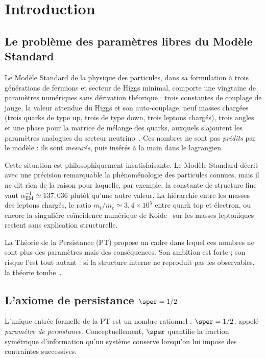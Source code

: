 \section{Introduction}
\label{sec:intro}

\subsection{Le problème des paramètres libres du Modèle Standard}
\label{sec:intro:libres}

Le Modèle Standard de la physique des particules, dans sa formulation à trois générations de fermions et secteur de Higgs minimal, comporte une vingtaine de paramètres numériques sans dérivation théorique : trois constantes de couplage de jauge, la valeur attendue du Higgs et son auto-couplage, neuf masses chargées (trois quarks de type up, trois de type down, trois leptons chargés), trois angles et une phase pour la matrice de mélange des quarks, auxquels s'ajoutent les paramètres analogues du secteur neutrino~\cite{PDG2024}. Ces nombres ne sont pas \emph{prédits} par le modèle : ils sont \emph{mesurés}, puis insérés à la main dans le lagrangien.

Cette situation est philosophiquement insatisfaisante. Le Modèle Standard décrit avec une précision remarquable la phénoménologie des particules connues, mais il ne dit rien de la raison pour laquelle, par exemple, la constante de structure fine vaut $\alpha_{\mathrm{EM}}^{-1} \simeq 137{,}036$ plutôt qu'une autre valeur. La hiérarchie entre les masses des leptons chargés, le ratio $m_t/m_e \simeq 3{,}4 \times 10^5$ entre quark top et électron, ou encore la singulière coïncidence numérique de Koide~\cite{Koide1983} sur les masses leptoniques restent sans explication structurelle.

La Théorie de la Persistance (PT) propose un cadre dans lequel ces nombres ne sont plus des paramètres mais des conséquences. Son ambition est forte ; son risque l'est tout autant : si la structure interne ne reproduit pas les observables, la théorie tombe~\cite{PT_Monograph}.

\subsection{L'axiome de persistance \texorpdfstring{$\sper = 1/2$}{s = 1/2}}
\label{sec:intro:axiome}

L'unique entrée formelle de la PT est un nombre rationnel : $\sper = 1/2$, appelé \emph{paramètre de persistance}. Conceptuellement, $\sper$ quantifie la fraction symétrique d'information qu'un système conserve lorsqu'on lui impose des contraintes successives.

